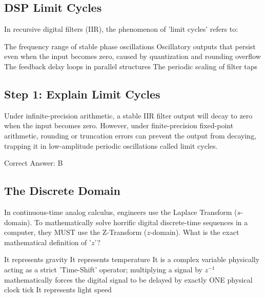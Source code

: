 \clearpage

\subsection{DSP Limit Cycles}

In recursive digital filters (IIR), the phenomenon of 'limit cycles' refers to:

\begin{choices}
    \choice The frequency range of stable phase oscillations
    \correctchoice Oscillatory outputs that persist even when the input becomes zero, caused by quantization and rounding overflow
    \choice The feedback delay loops in parallel structures
    \choice The periodic scaling of filter taps
\end{choices}

\begin{solution}

\subsection*{Step 1: Explain Limit Cycles}
Under infinite-precision arithmetic, a stable IIR filter output will decay to zero when the input becomes zero. However, under finite-precision fixed-point arithmetic, rounding or truncation errors can prevent the output from decaying, trapping it in low-amplitude periodic oscillations called limit cycles.

Correct Answer: B
\end{solution}

\clearpage

\subsection{The Discrete Domain}

In continuous-time analog calculus, engineers use the Laplace Transform ($s$-domain). To mathematically solve horrific digital discrete-time sequences in a computer, they MUST use the Z-Transform ($z$-domain). What is the exact mathematical definition of '$z$'?

\begin{choices}
    \choice It represents gravity
    \choice It represents temperature
    \correctchoice It is a complex variable physically acting as a strict 'Time-Shift' operator; multiplying a signal by $z^{-1}$ mathematically forces the digital signal to be delayed by exactly ONE physical clock tick
    \choice It represents light speed
\end{choices}

